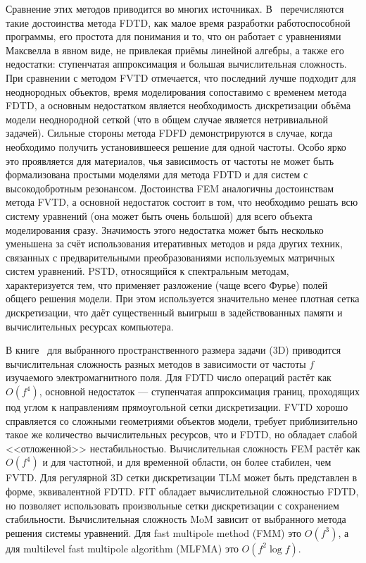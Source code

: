 Сравнение этих методов приводится во многих источниках.
В~\cite{Inan-FDTD-2011} перечисляются такие достоинства метода FDTD,
как малое время разработки работоспособной программы, его простота
для понимания и то, что он работает с уравнениями Максвелла в явном
виде, не привлекая приёмы линейной алгебры, а также его недостатки:
ступенчатая аппроксимация и большая вычислительная сложность.  При
сравнении с методом FVTD отмечается, что последний лучше подходит для
неоднородных объектов, время моделирования сопоставимо с временем
метода FDTD, а основным недостатком является необходимость
дискретизации объёма модели неоднородной сеткой (что в общем случае
является нетривиальной задачей).  Сильные стороны метода FDFD
демонстрируются в случае, когда необходимо получить установившееся
решение для одной частоты.  Особо ярко это проявляется для материалов,
чья зависимость от частоты не может быть формализована простыми
моделями для метода FDTD и для систем с высокодобротным резонансом.
Достоинства FEM аналогичны достоинствам метода FVTD, а основной
недостаток состоит в том, что необходимо решать всю систему уравнений
(она может быть очень большой) для всего объекта моделирования
сразу. Значимость этого недостатка может быть несколько уменьшена за
счёт использования итеративных методов и ряда других техник, связанных
с предварительными преобразованиями используемых матричных систем
уравнений.  PSTD, относящийся к спектральным методам, характеризуется
тем, что применяет разложение (чаще всего Фурье) полей общего решения
модели.  При этом используется значительно менее плотная сетка
дискретизации, что даёт существенный выигрыш в задействованных памяти
и вычислительных ресурсах компьютера.

В книге~\cite{Bondenson-CEM-2005} для выбранного пространственного
размера задачи (3D) приводится вычислительная сложность разных методов
в зависимости от частоты $f$ изучаемого электромагнитного поля.  Для
FDTD число операций растёт как $O(f^4)$, основной недостаток ---
ступенчатая аппроксимация границ, проходящих под углом к направлениям
прямоугольной сетки дискретизации.  FVTD хорошо справляется со
сложными геометриями объектов модели, требует приблизительно такое же
количество вычислительных ресурсов, что и
FDTD, но обладает слабой <<отложенной>> нестабильностью.
Вычислительная сложность FEM растёт как $O(f^4)$ и для частотной, и
для временной области, он более стабилен, чем FVTD.  Для регулярной 3D
сетки дискретизации TLM может быть представлен в форме, эквивалентной
FDTD.  FIT обладает вычислительной сложностью FDTD, но позволяет
использовать произвольные сетки дискретизации с сохранением
стабильности.  Вычислительная сложность MoM зависит от выбранного
метода решения системы уравнений.  Для fast multipole method (FMM) это
$O(f^3)$, а для multilevel fast multipole algorithm (MLFMA) это
$O(f^2\log f)$.

